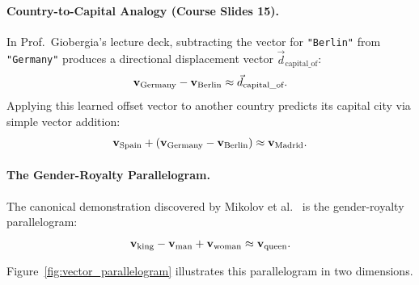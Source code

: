 \documentclass[../../main.tex]{subfiles}
\begin{document}
\paragraph{Country-to-Capital Analogy (Course Slides 15).}
In Prof.~Giobergia's lecture deck, subtracting the vector for \texttt{"Berlin"} from \texttt{"Germany"} produces a directional displacement vector $\vec{d}_{\text{capital\_of}}$:
\begin{equation}
\label{eq:rel_germany_berlin}
\mathbf{v}_{\text{Germany}} - \mathbf{v}_{\text{Berlin}} \approx \vec{d}_{\text{capital\_of}}.
\end{equation}
Applying this learned offset vector to another country predicts its capital city via simple vector addition:
\begin{equation}
\label{eq:rel_spain_madrid}
\mathbf{v}_{\text{Spain}} + (\mathbf{v}_{\text{Germany}} - \mathbf{v}_{\text{Berlin}}) \approx \mathbf{v}_{\text{Madrid}}.
\end{equation}

\paragraph{The Gender-Royalty Parallelogram.}
The canonical demonstration discovered by Mikolov et al.~\cite{mikolov2013distributed} is the gender-royalty parallelogram:
\begin{equation}
\label{eq:king_queen_arithmetic}
\mathbf{v}_{\text{king}} - \mathbf{v}_{\text{man}} + \mathbf{v}_{\text{woman}} \approx \mathbf{v}_{\text{queen}}.
\end{equation}

Figure~\ref{fig:vector_parallelogram} illustrates this parallelogram in two dimensions.
\end{document}
